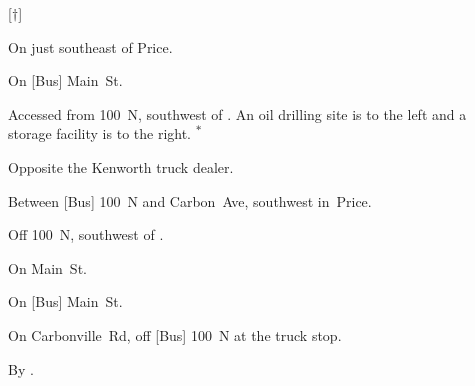 
[$\dagger$]

\begin{LocationList}

On   just southeast of Price.

On [Bus]  Main~St.

Accessed from 100~N, southwest of  .
An oil drilling site is to the left and a storage facility is to the right.%
\textsuperscript{\scriptsize $\ast$}

\Location{\GarageHQ \Garage}
Opposite the Kenworth truck dealer.

Between [Bus]  100~N and  Carbon~Ave, southwest in~Price.

Off 100~N, southwest of  .

\Location{\RecruitmentAgency \Recruitment}
On Main~St.

On [Bus]  Main~St.

On Carbonville~Rd, off [Bus]  100~N at the truck stop.

\Location{\TruckStop \Gas \Rest}
By   .

\end{LocationList}
